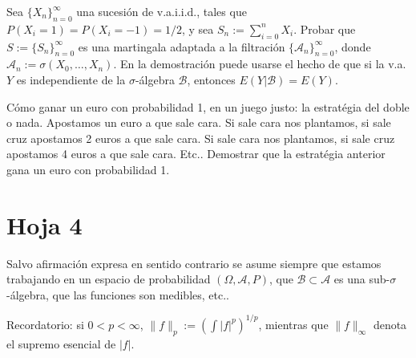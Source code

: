 
\begin{problem}[4] Sea $\{X_n\}_{n=0}^{\infty}$ una sucesi\'on de v.a.i.i.d., tales que 
$P(X_i = 1)= P(X_i = -1) = 1/2$, y sea $S_n := \sum_{i=0}^n X_i$.
Probar que $S := \{S_n\}_{n=0}^{\infty}$  es una martingala adaptada a la filtraci\'on
$\{\mathcal{A}_n\}_{n=0}^{\infty}$, donde $\mathcal{A}_n := \sigma(X_0, \dots, X_n)$.
En la demostraci\'on puede usarse el hecho de que si la v.a. $Y$ es independiente
de la $\sigma$-\'algebra $\mathcal{B}$, entonces $E(Y|\mathcal{B}) = E(Y)$.
\solution

\begin{expla}

\end{expla}

\end{problem}


\begin{problem}[5] C\'omo ganar un euro con probabilidad 1, en un juego justo: la estrat\'egia del doble o nada.
Apostamos un euro a que sale cara. Si sale cara nos plantamos, si sale cruz apostamos
2 euros a que sale cara. Si sale cara nos plantamos, si sale cruz apostamos
4 euros a que sale cara. Etc.. Demostrar que la  estrat\'egia anterior gana un euro
 con probabilidad 1.
\solution

\begin{expla}

\end{expla}

\end{problem}




\newpage
\section{Hoja 4}

Salvo afirmaci\'on expresa en sentido
contrario se asume siempre que estamos trabajando en un espacio de probabilidad $(\Omega, \mathcal{A}, P)$,
que  $\mathcal{B}\subset \mathcal{A}$ es una sub-$\sigma$-\'algebra, que las funciones son medibles, etc..

Recordatorio: si $0 < p < \infty$, $\|f\|_p := \left(\int|f|^p\right)^{1/p}$, mientras que
$\|f\|_\infty$ denota el supremo esencial de $|f|$. 

